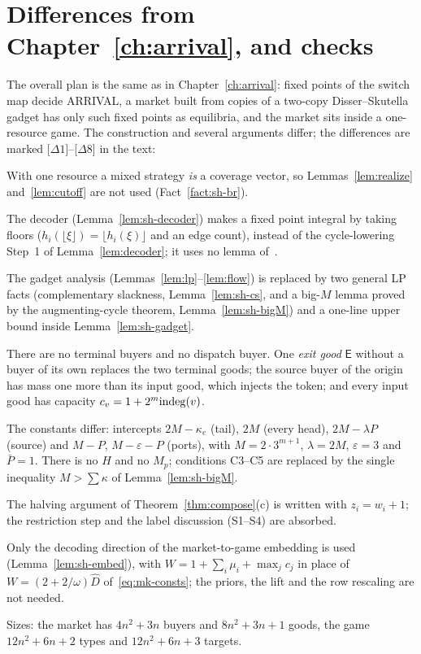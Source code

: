 \section{Differences from Chapter~\ref{ch:arrival}, and checks}\label{sec:sh-diff}

The overall plan
is the same as in Chapter~\ref{ch:arrival}: fixed points of the switch map decide ARRIVAL, a market built
from copies of a two-copy Disser--Skutella gadget has only such fixed points as equilibria, and the market
sits inside a one-resource game. The construction and several arguments differ; the differences are
marked [$\Delta1$]--[$\Delta8$] in the text:
\begin{enumerate}[nosep,label={[$\Delta$\arabic*]}]
\item With one resource a mixed strategy \emph{is} a coverage vector, so Lemmas~\ref{lem:realize}
and~\ref{lem:cutoff} are not used (Fact~\ref{fact:sh-br}).
\item The decoder (Lemma~\ref{lem:sh-decoder}) makes a fixed point integral by taking floors
($h_i(\lfloor\xi\rfloor)=\lfloor h_i(\xi)\rfloor$ and an edge count), instead of the cycle-lowering
Step~1 of Lemma~\ref{lem:decoder}; it uses no lemma of~\cite{haslebacher25}.
\item The gadget analysis (Lemmas~\ref{lem:lp}--\ref{lem:flow}) is replaced by two general LP facts
(complementary slackness, Lemma~\ref{lem:sh-cs}, and a big-$M$ lemma proved by the augmenting-cycle
theorem, Lemma~\ref{lem:sh-bigM}) and a one-line upper bound inside Lemma~\ref{lem:sh-gadget}.
\item There are no terminal buyers and no dispatch buyer. One \emph{exit good} $\mathsf E$ without a
buyer of its own replaces the two terminal goods; the source buyer of the origin has mass one more than
its input good, which injects the token; and every input good has capacity
$c_v=1+2^m\mathrm{indeg}(v)$.
\item The constants differ: intercepts $2M-\kappa_e$ (tail), $2M$ (every head), $2M-\lambda P$ (source)
and $M-P$, $M-\varepsilon-P$ (ports), with $M=2\cdot3^{m+1}$, $\lambda=2M$, $\varepsilon=3$ and
$\bar P=1$. There is no $H$ and no $M_p$; conditions C3--C5 are replaced by the single inequality
$M>\sum\kappa$ of Lemma~\ref{lem:sh-bigM}.
\item The halving argument of Theorem~\ref{thm:compose}(c) is written with $z_i=w_i+1$; the restriction
step and the label discussion (S1--S4) are absorbed.
\item Only the decoding direction of the market-to-game embedding is used (Lemma~\ref{lem:sh-embed}),
with $W=1+\sum_i\mu_i+\max_jc_j$ in place of $W=(2+2/\omega)\hat D$ of~\eqref{eq:mk-consts}; the
priors, the lift and the row rescaling are not needed.
\item Sizes: the market has $4n^2+3n$ buyers and $8n^2+3n+1$ goods, the game $12n^2+6n+2$ types and
$12n^2+6n+3$ targets.
\end{enumerate}
